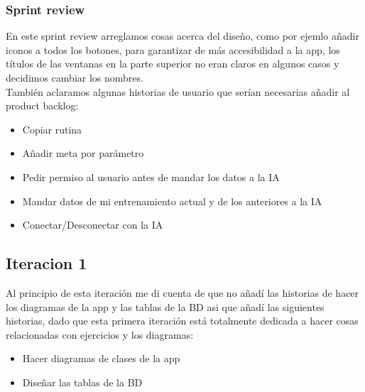 \subsubsection{Sprint review}
En este sprint review arreglamos cosas acerca del diseño, como por ejemlo añadir iconos a todos los botones, para garantizar de más accesibilidad a la app, los títulos de las ventanas en la parte superior no eran claros en algunos casos y decidimos cambiar los nombres.\\

También aclaramos algunas historias de usuario que serían necesarias añadir al product backlog:
\begin{itemize}
	\item Copiar rutina
	\item Añadir meta por parámetro
	\item Pedir permiso al usuario antes de mandar los datos a la IA
	\item Mandar datos de mi entrenamiento actual y de los anteriores a la IA
	\item Conectar/Desconectar con la IA
\end{itemize}

\subsection{Iteracion 1}
Al principio de esta iteración me di cuenta de que no añadí las historias de hacer los diagramas de la app y las tablas de la BD asi que añadí las siguientes historias, dado que esta primera iteración está totalmente dedicada a hacer cosas relacionadas con ejercicios y los diagramas:
\begin{itemize}
	\item Hacer diagramas de clases de la app
	\item Diseñar las tablas de la BD
\end{itemize}
